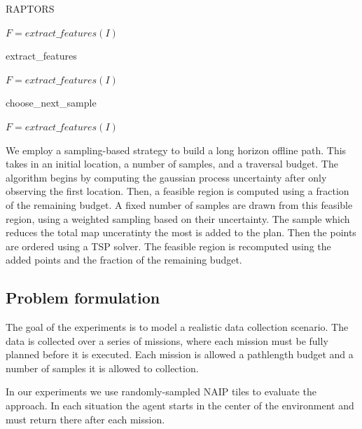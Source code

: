 \begin{algorithm}
\caption{RAPTORS}\label{alg:methods:RAPTORS}
\begin{algorithmic}
\State $F = extract\_features(I)$
\end{algorithmic}
\end{algorithm}

\begin{algorithm}
\caption{extract\_features}\label{alg:methods:extract_features}
\begin{algorithmic}
\State $F = extract\_features(I)$
\end{algorithmic}
\end{algorithm}

\begin{algorithm}
\caption{choose\_next\_sample}\label{alg:methods:choose_next_sample}
\begin{algorithmic}
\State $F = extract\_features(I)$
\end{algorithmic}
\end{algorithm}



 We employ a sampling-based strategy to build a long horizon offline path. This takes in an initial location, a number of samples, and a traversal budget. The algorithm begins by computing the gaussian process uncertainty after only observing the first location. Then, a feasible region is computed using a fraction of the remaining budget. A fixed number of samples are drawn from this feasible region, using a weighted sampling based on their uncertainty. The sample which reduces the total map unceratinty the most is added to the plan. Then the points are ordered using a TSP solver. The feasible region is recomputed using the added points and the fraction of the remaining budget.

\subsection{Problem formulation}
The goal of the experiments is to model a realistic data collection scenario. The data is collected over a series of missions, where each mission must be fully planned before it is executed. Each mission is allowed a pathlength budget and a number of samples it is allowed to collection. 

In our experiments we use randomly-sampled NAIP tiles to evaluate the approach. In each situation the agent starts in the center of the environment and must return there after each mission.

